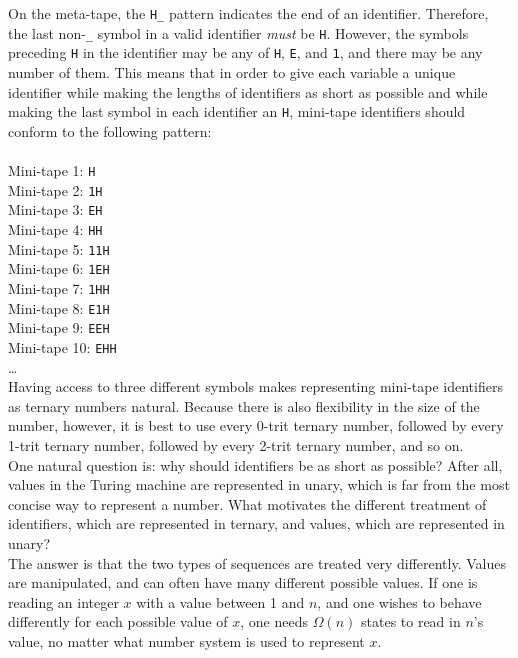 On the meta-tape, the \texttt{H\_} pattern indicates the end of an identifier. Therefore, the last non-\texttt{\_} symbol in a valid identifier \emph{must} be \texttt{H}. However, the symbols preceding \texttt{H} in the identifier may be any of \texttt{H}, \texttt{E}, and \texttt{1}, and there may be any number of them. This means that in order to give each variable a unique identifier while making the lengths of identifiers as short as possible and while making the last symbol in each identifier an \texttt{H}, mini-tape identifiers should conform to the following pattern: \\ \\
Mini-tape 1: \texttt{H} \\
Mini-tape 2: \texttt{1H} \\
Mini-tape 3: \texttt{EH} \\
Mini-tape 4: \texttt{HH} \\
Mini-tape 5: \texttt{11H} \\
Mini-tape 6: \texttt{1EH} \\
Mini-tape 7: \texttt{1HH} \\
Mini-tape 8: \texttt{E1H} \\
Mini-tape 9: \texttt{EEH} \\
Mini-tape 10: \texttt{EHH} \\
\dots \\

Having access to three different symbols makes representing mini-tape identifiers as ternary numbers natural. Because there is also flexibility in the size of the number, however, it is best to use every 0-trit ternary number, followed by every 1-trit ternary number, followed by every 2-trit ternary number, and so on. \\

One natural question is: why should identifiers be as short as possible? After all, values in the Turing machine are represented in unary, which is far from the most concise way to represent a number. What motivates the different treatment of identifiers, which are represented in ternary, and values, which are represented in unary? \\

The answer is that the two types of sequences are treated very differently. Values are manipulated, and can often have many different possible values. If one is reading an integer $x$ with a value between 1 and $n$, and one wishes to behave differently for each possible value of $x$, one needs $\Omega(n)$ states to read in $n$'s value, no matter what number system is used to represent $x$. \\

